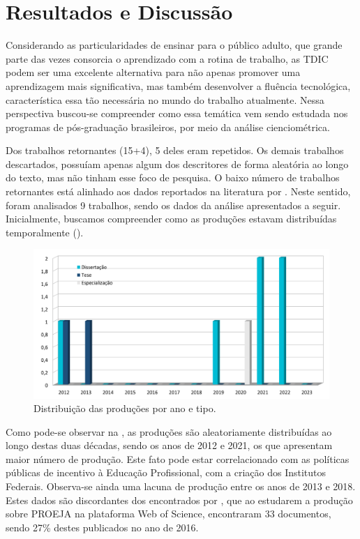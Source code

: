 \section{Resultados e Discussão}\label{sec-resultados}

Considerando as particularidades de ensinar para o público adulto, que
grande parte das vezes consorcia o aprendizado com a rotina de trabalho,
as TDIC podem ser uma excelente alternativa para não apenas promover uma
aprendizagem mais significativa, mas também desenvolver a fluência
tecnológica, característica essa tão necessária no mundo do trabalho
atualmente. Nessa perspectiva buscou-se compreender como essa temática
vem sendo estudada nos programas de pós-graduação brasileiros, por meio
da análise cienciométrica.

Dos trabalhos retornantes (15+4), 5 deles eram repetidos. Os demais
trabalhos descartados, possuíam apenas algum dos descritores de forma
aleatória ao longo do texto, mas não tinham esse foco de pesquisa. O
baixo número de trabalhos retornantes está alinhado aos dados reportados
na literatura por \textcite{BrancoPinto2022}. Neste sentido, foram analisados
9 trabalhos, sendo os dados da análise apresentados a seguir.
Inicialmente, buscamos compreender como as produções estavam
distribuídas temporalmente ().

\begin{figure}[!htpb]
\centering
\begin{minipage}{.75\textwidth}
\caption{Distribuição das produções por ano e tipo.}\label{fig2}
\includegraphics[width=\textwidth]{Fig2.png}
\end{minipage}
\end{figure}


Como pode-se observar na , as produções são aleatoriamente
distribuídas ao longo destas duas décadas, sendo os anos de 2012 e 2021,
os que apresentam maior número de produção. Este fato pode estar
correlacionado com as políticas públicas de incentivo à Educação
Profissional, com a criação dos Institutos Federais. Observa-se ainda
uma lacuna de produção entre os anos de 2013 e 2018. Estes dados são
discordantes dos encontrados por \textcite{vieira2021}, que ao
estudarem a produção sobre PROEJA na plataforma Web of Science,
encontraram 33 documentos, sendo 27\% destes publicados no ano de 2016.

